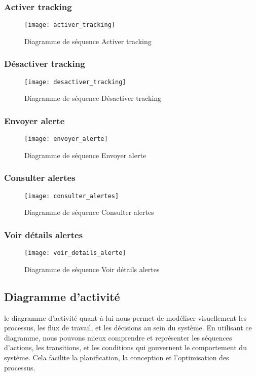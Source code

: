 \subsubsection{Activer tracking}
\begin{figure}[H]
	\texttt{[image: activer\_tracking]}
	\caption{Diagramme de séquence Activer tracking}
\end{figure}

\subsubsection{Désactiver tracking}
\begin{figure}[H]
	\texttt{[image: desactiver\_tracking]}
	\caption{Diagramme de séquence Désactiver tracking}
\end{figure}

\subsubsection{Envoyer alerte}
\begin{figure}[H]
	\texttt{[image: envoyer\_alerte]}
	\caption{Diagramme de séquence Envoyer alerte}
\end{figure}

\subsubsection{Consulter alertes}
\begin{figure}[H]
	\texttt{[image: consulter\_alertes]}
	\caption{Diagramme de séquence Consulter alertes}
\end{figure}

\subsubsection{Voir détails alertes}
\begin{figure}[H]
	\texttt{[image: voir\_details\_alerte]}
	\caption{Diagramme de séquence Voir détails alertes}
\end{figure}

\subsection{Diagramme d’activité}
le diagramme d'activité quant à lui nous permet de modéliser visuellement les processus, les flux de travail, et les décisions au sein du système. En utilisant ce diagramme, nous pouvons mieux comprendre et représenter les séquences d'actions, les transitions, et les conditions qui gouvernent le comportement du système. Cela facilite la planification, la conception et l'optimisation des processus.


